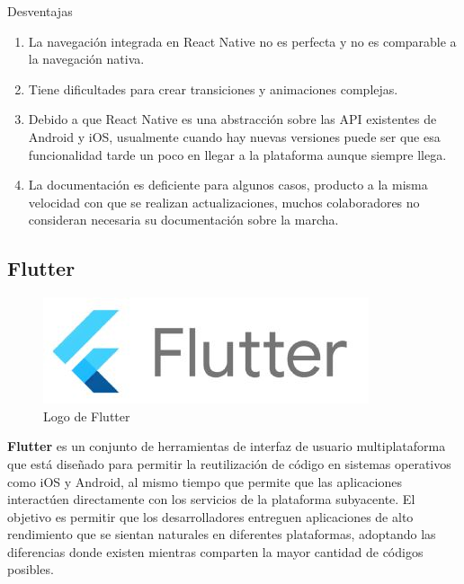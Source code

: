 Desventajas
\begin{enumerate}



\item	La navegación integrada en React Native no es perfecta y no es comparable a la navegación nativa.
\item	Tiene dificultades para crear transiciones y animaciones complejas.
\item	Debido a que React Native es una abstracción sobre las API existentes de Android y iOS, usualmente cuando hay nuevas versiones puede ser que esa funcionalidad tarde un poco en llegar a la plataforma aunque siempre llega.
\item La documentación es deficiente para algunos casos, producto a la misma velocidad con que se realizan actualizaciones, muchos colaboradores no consideran necesaria su documentación sobre la marcha.
\end{enumerate}

\subsection{Flutter}\label{chapter:introduction}


\begin{figure}[h!]
\begin{center}
\includegraphics[scale=0.5]{Graphics/images/LogodeFlutter.jpg}
\caption{Logo de Flutter}
\label{fig:dh}

\end{center}
\end{figure}


\textbf{Flutter}  es un conjunto de herramientas de interfaz de usuario multiplataforma que está diseñado para permitir la reutilización de código en sistemas operativos como iOS y Android, al mismo tiempo que permite que las aplicaciones interactúen directamente con los servicios de la plataforma subyacente. El objetivo es permitir que los desarrolladores entreguen aplicaciones de alto rendimiento que se sientan naturales en diferentes plataformas, adoptando las diferencias donde existen mientras comparten la mayor cantidad de códigos posibles.

